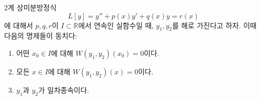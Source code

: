 \documentclass[../engineering_mathematics_lecture_note.tex]{subfiles}
\begin{document}
\begin{theorem} \label{thm:wronskian_independence}
    2계 상미분방정식
    \begin{equation*}
        L[y] = y'' + p(x) y' + q(x) y = r(x)
    \end{equation*}
    에 대해서
    $p, q, r$이 $I \subset \mathbb R$에서 연속인 실함수일 때, $y_1, y_2$를 해로 가진다고 하자.
    이때 다음의 명제들이 동치다:
    \begin{enumerate}
        \item 어떤 $x_0 \in I$에 대해 $W(y_1, y_2)(x_0) = 0$이다.
        \item 모든 $x \in I$에 대해 $W(y_1, y_2)(x) = 0$이다.
        \item $y_1$과 $y_2$가 일차종속이다.
    \end{enumerate}
\end{theorem}
\end{document}
